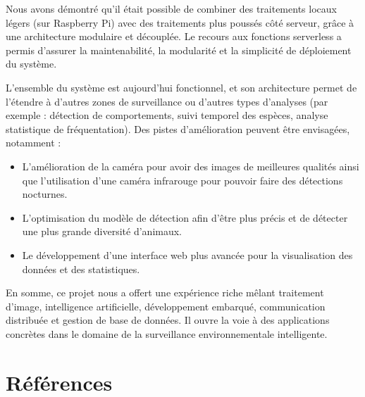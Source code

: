 \documentclass[a4paper,11pt]{article}
\begin{document}
	Nous avons démontré qu’il était possible de combiner des traitements locaux légers (sur Raspberry Pi) avec des traitements plus poussés côté serveur, grâce à une architecture modulaire et découplée. Le recours aux fonctions serverless a permis d’assurer la maintenabilité, la modularité et la simplicité de déploiement du système.
	
	L’ensemble du système est aujourd’hui fonctionnel, et son architecture permet de l’étendre à d’autres zones de surveillance ou d’autres types d’analyses (par exemple : détection de comportements, suivi temporel des espèces, analyse statistique de fréquentation). Des pistes d’amélioration peuvent être envisagées, notamment :\\
	
	\begin{itemize}
		\item L'amélioration de la caméra pour avoir des images de meilleures qualités ainsi que l'utilisation d'une caméra infrarouge pour pouvoir faire des détections nocturnes.
		\item L'optimisation du modèle de détection afin d'être plus précis et de détecter une plus grande diversité d'animaux.
		\item Le développement d’une interface web plus avancée pour la visualisation des données et des statistiques.\\
	\end{itemize}
	
	En somme, ce projet nous a offert une expérience riche mêlant traitement d’image, intelligence artificielle, développement embarqué, communication distribuée et gestion de base de données. Il ouvre la voie à des applications concrètes dans le domaine de la surveillance environnementale intelligente.
	
	\section{Références}
	
\end{document}
